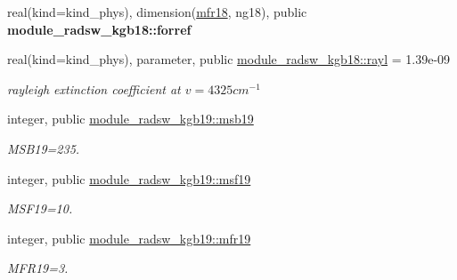 \begin{DoxyCompactItemize}
\mbox{\label{group__module__radsw__kgbnn_ga0efc293c91de3d17b29ed713ff09d7a9}} 
real(kind=kind\+\_\+phys), dimension(\hyperlink{group__module__radsw__kgbnn_ga9fa8140413e7ec769baea4f207e58393}{mfr18}, ng18), public {\bfseries module\+\_\+radsw\+\_\+kgb18\+::forref}
\item 
\mbox{\label{group__module__radsw__kgbnn_ga9cd3f07e259e4982c7ef2889fee6cccb}} 
real(kind=kind\+\_\+phys), parameter, public \hyperlink{group__module__radsw__kgbnn_ga9cd3f07e259e4982c7ef2889fee6cccb}{module\+\_\+radsw\+\_\+kgb18\+::rayl} = 1.\+39e-\/09
\begin{DoxyCompactList}\small\item\em rayleigh extinction coefficient at $v=4325 cm^{-1}$ \end{DoxyCompactList}\item 
\mbox{\label{group__module__radsw__kgbnn_ga42771fcf9dd17b5c9d0d03cb2bf1c923}} 
integer, public \hyperlink{group__module__radsw__kgbnn_ga42771fcf9dd17b5c9d0d03cb2bf1c923}{module\+\_\+radsw\+\_\+kgb19\+::msb19}
\begin{DoxyCompactList}\small\item\em M\+S\+B19=235. \end{DoxyCompactList}\item 
\mbox{\label{group__module__radsw__kgbnn_ga86778b12ff439f4f83fda891e7ae2bfe}} 
integer, public \hyperlink{group__module__radsw__kgbnn_ga86778b12ff439f4f83fda891e7ae2bfe}{module\+\_\+radsw\+\_\+kgb19\+::msf19}
\begin{DoxyCompactList}\small\item\em M\+S\+F19=10. \end{DoxyCompactList}\item 
\mbox{\label{group__module__radsw__kgbnn_ga57f837ef4316dc2441bca3fde3998156}} 
integer, public \hyperlink{group__module__radsw__kgbnn_ga57f837ef4316dc2441bca3fde3998156}{module\+\_\+radsw\+\_\+kgb19\+::mfr19}
\begin{DoxyCompactList}\small\item\em M\+F\+R19=3. \end{DoxyCompactList}\item 
\mbox{\label{group__module__radsw__kgbnn_gadb26cae00c05ac5c048a4db5a319a2eb}} 

\end{DoxyCompactItemize}
